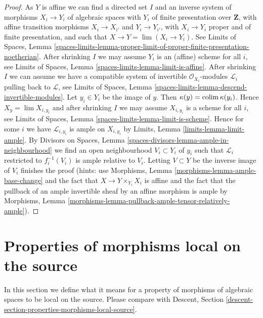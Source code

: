 \begin{proof}
\medskip\noindent
As $Y$ is affine we can find a directed set $I$ and an
inverse system of morphisms $X_i \to Y_i$ of algebraic spaces
with $Y_i$ of finite presentation over $\mathbf{Z}$, with affine
transition morphisms $X_i \to X_{i'}$ and $Y_i \to Y_{i'}$,
with $X_i \to Y_i$ proper and of finite presentation, and such that
$X \to Y = \lim (X_i \to Y_i)$. See Limits of Spaces, Lemma
\ref{spaces-limits-lemma-proper-limit-of-proper-finite-presentation-noetherian}.
After shrinking $I$ we may assume $Y_i$ is an (affine) scheme for all $i$,
see Limits of Spaces, Lemma \ref{spaces-limits-lemma-limit-is-affine}.
After shrinking $I$ we can assume we have a compatible system of
invertible $\mathcal{O}_{X_i}$-modules $\mathcal{L}_i$
pulling back to $\mathcal{L}$, see
Limits of Spaces, Lemma \ref{spaces-limits-lemma-descend-invertible-modules}.
Let $y_i \in Y_i$ be the image of $y$.
Then $\kappa(y) = \operatorname{colim} \kappa(y_i)$.
Hence $X_y = \lim X_{i, y_i}$ and after shrinking $I$ we
may assume $X_{i, y_i}$ is a scheme for all $i$, see
Limits of Spaces, Lemma \ref{spaces-limits-lemma-limit-is-scheme}.
Hence for some $i$ we have $\mathcal{L}_{i, y_i}$
is ample on $X_{i, y_i}$ by
Limits, Lemma \ref{limits-lemma-limit-ample}.
By Divisors on Spaces, Lemma \ref{spaces-divisors-lemma-ample-in-neighbourhood}
we find an open neighbourhood
$V_i \subset Y_i$ of $y_i$ such that
$\mathcal{L}_i$ restricted to $f_i^{-1}(V_i)$
is ample relative to $V_i$.
Letting $V \subset Y$ be the inverse image of
$V_i$ finishes the proof (hints: use
Morphisms, Lemma \ref{morphisms-lemma-ample-base-change} and
the fact that $X \to Y \times_{Y_i} X_i$ is affine
and the fact that the pullback of an
ample invertible sheaf by an affine morphism is ample by
Morphisms, Lemma \ref{morphisms-lemma-pullback-ample-tensor-relatively-ample}).
\end{proof}

\section{Properties of morphisms local on the source}
\label{spaces-descent-section-properties-morphisms-local-source}
In this section we define what it means for a property of morphisms of
algebraic spaces to be local on the source. Please compare with
Descent, Section \ref{descent-section-properties-morphisms-local-source}.

